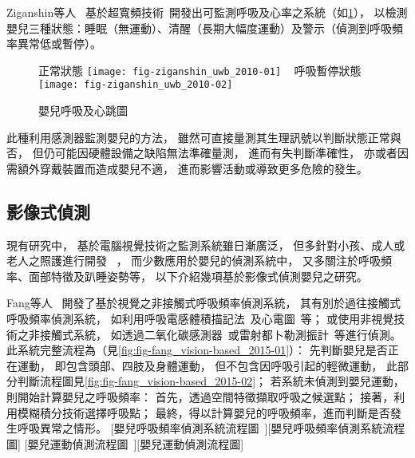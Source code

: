 \documentclass[class=NCU_thesis, crop=false]{standalone}
\begin{document}
Ziganshin等人~\cite{ziganshin_uwb_2010}
基於超寬頻技術~\cite{staderini_uwb_2002}開發出可監測呼吸及心率之系統（如\cref{fig:fig-ziganshin_uwb_2010}），
以檢測嬰兒三種狀態：睡眠（無運動）、清醒（長期大幅度運動）及警示（偵測到呼吸頻率異常低或暫停）。
\begin{figure}[!hbt]
    \centering
    \subcaptionbox
        {正常狀態
        \label{fig:fig-ziganshin_uwb_2010-01}}
        {\texttt{[image: fig-ziganshin\_uwb\_2010-01]}}
    ~
    \subcaptionbox
        {呼吸暫停狀態
        \label{fig:fig-ziganshin_uwb_2010-02}}
        {\texttt{[image: fig-ziganshin\_uwb\_2010-02]}}
    \caption{嬰兒呼吸及心跳圖}
    \label{fig:fig-ziganshin_uwb_2010}
\end{figure}

此種利用感測器監測嬰兒的方法，
雖然可直接量測其生理訊號以判斷狀態正常與否，
但仍可能因硬體設備之缺陷無法準確量測，
進而有失判斷準確性，
亦或者因需額外穿戴裝置而造成嬰兒不適，
進而影響活動或導致更多危險的發生。

\subsection{影像式偵測}
現有研究中，
基於電腦視覺技術之監測系統雖日漸廣泛，
但多針對小孩、成人或老人之照護進行開發
~\cite{kuo_visual_2010, yiping_detection_2006, rudovic_culturenet_2018, liu_deep_2015}，
而少數應用於嬰兒的偵測系統中，
又多關注於呼吸頻率、面部特徵及趴睡姿勢等，
以下介紹幾項基於影像式偵測嬰兒之研究。

Fang等人~\cite{fang_vision-based_2015}
開發了基於視覺之非接觸式呼吸頻率偵測系統，
其有別於過往接觸式呼吸頻率偵測系統，
如利用呼吸電感體積描記法~\cite{mack_development_2009}及心電圖~\cite{berset_robust_2012}等；
或使用非視覺技術之非接觸式系統，
如透過二氧化碳感測器~\cite{cao_non-invasive_2007}或雷射都卜勒測振計~\cite{scalise_measurement_2011}等進行偵測。
此系統完整流程為（見\cref{fig:fig-fang_vision-based_2015-01}）：
先判斷嬰兒是否正在運動，
即包含頭部、四肢及身體運動，
但不包含因呼吸引起的輕微運動，
此部分判斷流程圖見\cref{fig:fig-fang_vision-based_2015-02}；
若系統未偵測到嬰兒運動，
則開始計算嬰兒之呼吸頻率：
首先，透過空間特徵擷取呼吸之候選點；
接著，利用模糊積分技術選擇呼吸點；
最終，得以計算嬰兒的呼吸頻率，進而判斷是否發生呼吸異常之情形。
[嬰兒呼吸頻率偵測系統流程圖~\cite{fang_vision-based_2015}][嬰兒呼吸頻率偵測系統流程圖]
[嬰兒運動偵測流程圖~\cite{fang_vision-based_2015}][嬰兒運動偵測流程圖]
\end{document}
